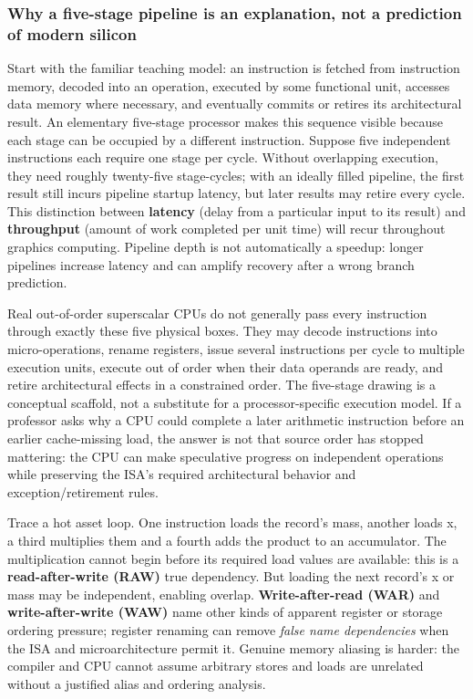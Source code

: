 \subsubsection{Why a five-stage pipeline is an explanation, not a prediction of modern silicon}\label{why-a-five-stage-pipeline-is-an-explanation-not-a-prediction-of-modern-silicon}

Start with the familiar teaching model: an instruction is fetched from instruction memory, decoded into an operation, executed by some functional unit, accesses data memory where necessary, and eventually commits or retires its architectural result. An elementary five-stage processor makes this sequence visible because each stage can be occupied by a different instruction. Suppose five independent instructions each require one stage per cycle. Without overlapping execution, they need roughly twenty-five stage-cycles; with an ideally filled pipeline, the first result still incurs pipeline startup latency, but later results may retire every cycle. This distinction between \textbf{latency} (delay from a particular input to its result) and \textbf{throughput} (amount of work completed per unit time) will recur throughout graphics computing. Pipeline depth is not automatically a speedup: longer pipelines increase latency and can amplify recovery after a wrong branch prediction.

Real out-of-order superscalar CPUs do not generally pass every instruction through exactly these five physical boxes. They may decode instructions into micro-operations, rename registers, issue several instructions per cycle to multiple execution units, execute out of order when their data operands are ready, and retire architectural effects in a constrained order. The five-stage drawing is a conceptual scaffold, not a substitute for a processor-specific execution model. If a professor asks why a CPU could complete a later arithmetic instruction before an earlier cache-missing load, the answer is not that source order has stopped mattering: the CPU can make speculative progress on independent operations while preserving the ISA's required architectural behavior and exception/retirement rules.

Trace a hot asset loop. One instruction loads the record's mass, another loads x, a third multiplies them and a fourth adds the product to an accumulator. The multiplication cannot begin before its required load values are available: this is a \textbf{read-after-write (RAW)} true dependency. But loading the next record's x or mass may be independent, enabling overlap. \textbf{Write-after-read (WAR)} and \textbf{write-after-write (WAW)} name other kinds of apparent register or storage ordering pressure; register renaming can remove \emph{false name dependencies} when the ISA and microarchitecture permit it. Genuine memory aliasing is harder: the compiler and CPU cannot assume arbitrary stores and loads are unrelated without a justified alias and ordering analysis.

